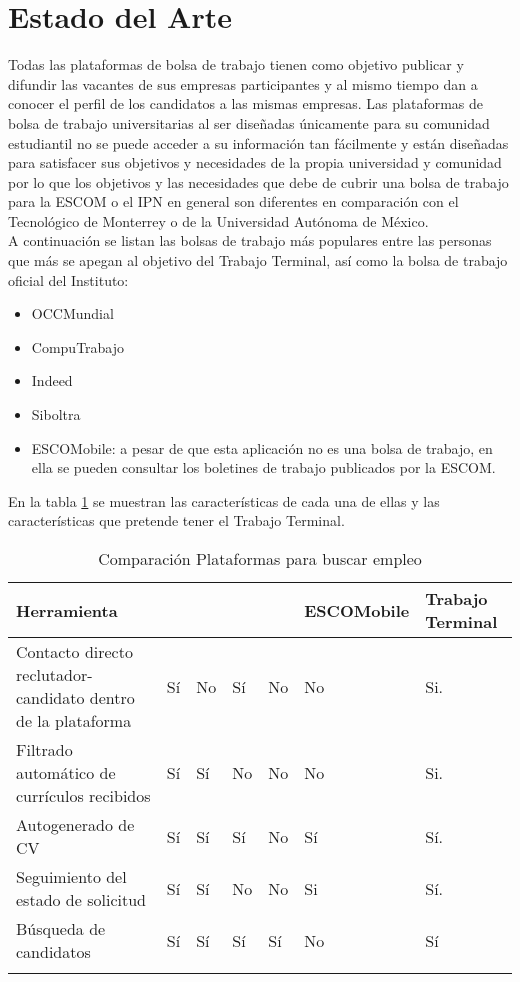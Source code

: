 \clearpage
\section{Estado del Arte}
Todas las plataformas de bolsa de trabajo tienen como objetivo publicar y difundir las vacantes de sus empresas participantes y al mismo tiempo dan a conocer el perfil de los candidatos a las mismas empresas.
Las plataformas de bolsa de trabajo universitarias al ser diseñadas únicamente para su comunidad estudiantil no se puede acceder 
a su información tan fácilmente y están diseñadas para satisfacer sus objetivos y necesidades de la propia universidad y comunidad por lo que los objetivos y las necesidades que debe de cubrir una bolsa de trabajo para la ESCOM o  el IPN en general son diferentes en comparación con el Tecnológico de Monterrey o de la Universidad Autónoma de México.\\
\newline
A continuación se listan las bolsas de trabajo más populares entre las personas que más se apegan al objetivo del Trabajo Terminal,
 así como  la bolsa de trabajo oficial del Instituto:
\begin{itemize}
    \item OCCMundial
    \item CompuTrabajo
    \item Indeed
    \item Siboltra 
    \item ESCOMobile: a pesar de que esta aplicación no es una bolsa de trabajo, en ella se pueden consultar los boletines de trabajo
    publicados por la ESCOM.
\end{itemize}
En la tabla \ref{table:herramientasSimilares} se muestran las características de cada una de ellas y las características que pretende tener el Trabajo Terminal.


\begin{longtable}{| p{}  | p{} | p{}  | p{}  | p{}  | p{}  |  p{}  |}

    \hline

    \textbf{Herramienta} & \IUocc{}	& \IUcompuT{}&  \IUIneed{} & \IUsisae{} & \scriptsize \textbf{ESCOMobile} & \scriptsize Trabajo Terminal\\ 
    \hline

    Contacto directo reclutador-candidato dentro de la plataforma & Sí & No  & Sí  & No  & No & Si.\\ \hline
    Filtrado automático de currículos recibidos & Sí & Sí & No & No & No & Si.\\ \hline
    Autogenerado de CV & Sí & Sí & Sí  & No & Sí & Sí. \\ \hline
    Seguimiento del estado de solicitud & Sí  & Sí & No & No  & Si& Sí. \\ \hline
    Búsqueda de candidatos & Sí & Sí & Sí & Sí & No & Sí\\ \hline

    \caption{Comparación Plataformas para buscar empleo}
    \label{table:herramientasSimilares}
\end{longtable}

